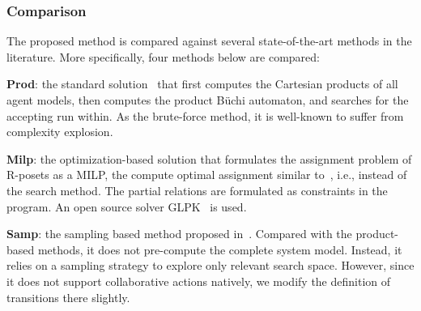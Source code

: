 \subsubsection{Comparison}\label{subsubsec:compare}
The proposed method is compared against several
state-of-the-art methods in the literature.
More specifically, four methods below are compared:

\textbf{Prod}: the standard solution~\citep{baier2008principles}
that first computes
the Cartesian products of all agent models,
then computes the product B\"uchi automaton,
and searches for the accepting run within.
As the brute-force method,
it is well-known to suffer from complexity explosion.

\textbf{Milp}: the optimization-based solution that
formulates the assignment problem of R-posets as a MILP,
the compute optimal assignment similar
to~\citep{luo2021temporal, jones2019scratchs},
i.e., instead of the search method.
The partial relations are formulated as constraints
in the program.
An open source solver GLPK~\citep{makhorin2008glpk} is used.

\textbf{Samp}: the sampling based method proposed
in~\citep{kantaros2020stylus}.
Compared with the product-based methods, it does not pre-compute
the complete system model. Instead, it relies on a sampling strategy
to explore only relevant search space.
However, since it does not support collaborative actions natively,
we modify the definition of transitions there slightly.

